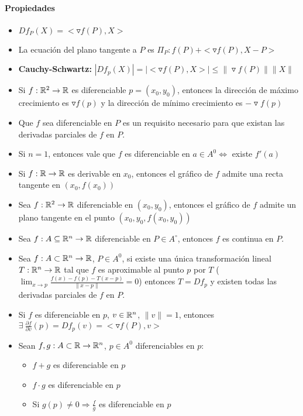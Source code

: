 \paragraph{Propiedades}
\begin{itemize}[resume]
    \item $Df_P(X) = <\triangledown f(P), X>$
    \item La ecuación del plano tangente a $P$ es $\Pi_P: f(P) + <\triangledown f(P), X-P>$
    \item \textbf{Cauchy-Schwartz:} $|Df_p(X)| = |<\triangledown f(P),X>|\leq \|\triangledown f(P)\|\|X\|$
    \item Si $f:\mathbb{R}^2\to\mathbb{R}$ es diferenciable $p = (x_0,y_0)$, entonces la dirección de máximo crecimiento es $\triangledown f(p)$ y la dirección de mínimo crecimiento es $-\triangledown f(p)$

 \item Que $f$ sea diferenciable en $P$ es un requisito necesario para que existan las derivadas parciales de $f$ en $P$.
    \item Si $n=1$, entonces vale que $f$ es diferenciable en $a\in A^0 \iff$ existe $f'(a)$
    
    \item Si $f:\mathbb{R}\to\mathbb{R}$ es derivable en $x_0$, entonces el gráfico de $f$ admite una recta tangente en $(x_0, f(x_0))$
    
    \item Sea $f:\mathbb{R}^2\to\mathbb{R}$ diferenciable en $(x_0,y_0)$, entonces el gráfico de $f$ admite un plano tangente en el punto $(x_0,y_0, f(x_0,y_0))$


    \item Sea $f:A\subseteq\mathbb{R}^n\to\mathbb{R}$ diferenciable en $P\in A^{\circ}$, entonces $f$ es continua en $P$.
    
    \item Sea $f:A\subset\mathbb{R}^n\to\mathbb{R}$, $P\in A^0$, si existe una única transformación lineal $T:\mathbb{R}^n\to\mathbb{R}$ tal que $f$ es aproximable al punto $p$ por $T$ ($\lim_{x\to p}\frac{f(x)-f(p)-T(x-p)}{\|x-p\|} = 0$) entonces $T = Df_p$ y existen todas las derivadas parciales de $f$ en $P$.
       \item Si $f$ es diferenciable en $p$, $v\in\mathbb{R}^n$, $\|v\|=1$, entonces $\exists~\frac{\partial f}{\partial v}(p) = Df_p(v) = <\triangledown f(P), v>$
    
    \item Sean $f,g:A\subset\mathbb{R}\to\mathbb{R}^n$, $p\in A^0$ diferenciables en $p$:
    \begin{itemize}
        \item $f+g$ es diferenciable en $p$
        \item $f\cdot g$ es diferenciable en $p$
        \item Si $g(p)\neq 0\Rightarrow \frac{f}{g}$ es diferenciable en $p$ 
    \end{itemize}
    

\end{itemize}
